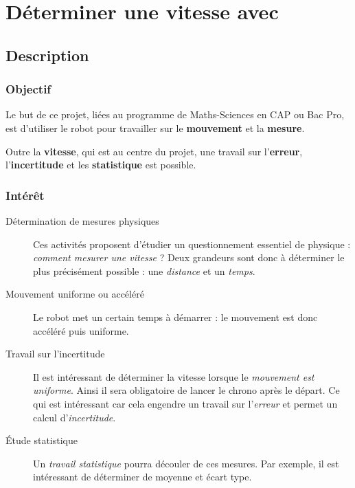 \section{Déterminer une vitesse avec \mbot}

\subsection{Description}

\subsubsection{Objectif}


\begin{formule}
Le but de ce projet, liées au programme de Maths-Sciences en CAP ou Bac Pro, est d'utiliser le robot \mbot pour travailler sur le \textbf{mouvement} et la \textbf{mesure}.

Outre la \textbf{vitesse}, qui est au centre du projet, une travail sur l'\textbf{erreur}, l'\textbf{incertitude} et les \textbf{statistique} est possible.
\end{formule}


\subsubsection{Intérêt}

\begin{description}
	\item [Détermination de mesures physiques] Ces activités proposent d'étudier un questionnement essentiel de physique : \emph{comment mesurer une vitesse} ? Deux grandeurs sont donc à déterminer le plus précisément possible : une \emph{distance} et un \emph{temps}.
	\item[Mouvement uniforme ou accéléré] Le robot \mbot met un certain temps à démarrer : le mouvement est donc accéléré puis uniforme. 
	\item [Travail sur l'incertitude]  
	Il est intéressant de déterminer la vitesse lorsque le \emph{mouvement est uniforme}. Ainsi il sera obligatoire de lancer le chrono après le départ. Ce qui est intéressant car cela engendre un travail sur l'\emph{erreur} et permet un calcul d'\emph{incertitude}.
	\item[Étude statistique] 	Un \emph{travail statistique} pourra découler de ces mesures. Par exemple, il est intéressant de déterminer de moyenne et écart type.
\end{description}



